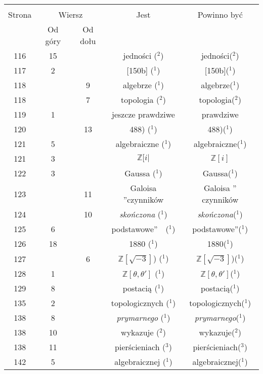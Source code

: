 \documentclass[a4paper,11pt]{article}
\begin{document}
\begin{center}
  \begin{tabular}{|c|c|c|c|c|}
    \hline
    & \multicolumn{2}{c|}{} & & \\
    Strona & \multicolumn{2}{c|}{Wiersz} & Jest
                              & Powinno być \\ \cline{2-3}
    & Od góry & Od dołu & & \\
    \hline
    116 & 15 & & jedności ($^{ 2 }$) & jedności($^{ 2 }$) \\
    117 &  2 & & [150b] ($^{ 1 }$) & [150b]($^{ 1 }$) \\
    118 & &  9 & algebrze ($^{ 1 }$) & algebrze($^{ 1 }$) \\
    118 & &  7 & topologia ($^{ 2 }$) & topologia($^{ 2 }$) \\
    119 &  1 & & jeszcze prawdziwe & prawdziwe \\
    120 & & 13 & 488) ($^{ 1 }$) & 488)($^{ 1 }$) \\
    121 &  5 & & algebraiczne ($^{ 1 }$) & algebraiczne($^{ 1 }$) \\
    121 &  3 & & $\mathbb{Z}[ i |$ & $\mathbb{Z}[ i ]$ \\
    122 &  3 & & Gaussa ($^{ 1 }$) & Gaussa($^{ 1 }$) \\
    123 & & 11 & Galoisa ''czynników  & Galoisa '' czynników \\
    124 & & 10 & \emph{skończona} ($^{ 1 }$) & \emph{skończona}($^{ 1 }$) \\
    125 &  6 & & podstawowe''~~($^{ 1 }$) & podstawowe''($^{ 1 }$) \\
    126 & 18 & & 1880 ($^{ 1 }$) & 1880($^{ 1 }$) \\
    127 & &  6 & $\mathbb{Z}[ \sqrt{ -3 } ]$) ($^{ 1 }$)
           & $\mathbb{Z}[ \sqrt{ -3 } ]$)($^{ 1 }$) \\
    128 &  1 & & $\mathbb{Z}[ \theta, \theta' ]$ ($^{ 1 }$)
           & $\mathbb{Z}[ \theta, \theta' ]$($^{ 1 }$) \\
    129 &  8 & & postacią ($^{ 1 }$) & postacią($^{ 1 }$) \\
    135 &  2 & & topologicznych ($^{ 1 }$) & topologicznych($^{ 1 }$) \\
    138 &  8 & & \emph{prymarnego} ($^{ 1 }$) & \emph{prymarnego}($^{ 1 }$) \\
    138 & 10 & & wykazuje ($^{ 2 }$) & wykazuje($^{ 2 }$) \\
    138 & 11 & & pierścieniach ($^{ 3 }$) & pierścieniach($^{ 3 }$) \\
    142 &  5 & & algebraicznej ($^{ 1 }$) & algebraicznej($^{ 1 }$) \\

\end{tabular}
\end{center}
\end{document}
